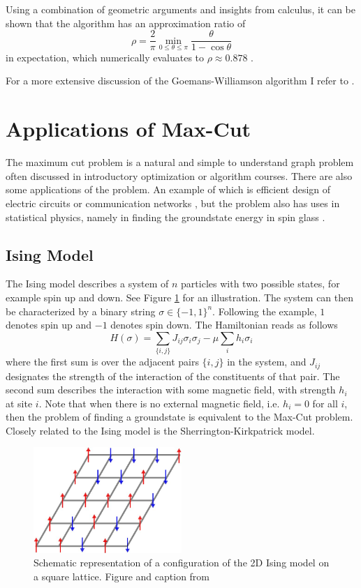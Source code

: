 Using a combination of geometric arguments and insights from calculus, it can be shown that the algorithm has an approximation ratio of 
\begin{equation}
\rho = \frac{2}{\pi} \min_{0 \leq \theta \leq \pi} \frac{\theta}{1 - \cos \theta}
\end{equation}
in expectation, which numerically evaluates to $\rho \approx 0.878$ \cite{GW95}. 

For a more extensive discussion of the Goemans-Williamson algorithm I refer to \cite{GW95,GW-lecture-Hollbach,lecture-GW}.

\section{Applications of Max-Cut}
The maximum cut problem is a natural and simple to understand graph problem often discussed in introductory optimization or algorithm courses. There are also some applications of the problem. An example of which is efficient design of electric circuits or communication networks \cite{wang2010maximum}, but the problem also has uses in statistical physics, namely in finding the groundstate energy in spin glass \cite{maxcut-applications}.

\subsection{Ising Model} %
The Ising model describes a system of $n$ particles with two possible states, for example spin up and down. See Figure \ref{fig:ising-model} for an illustration. The system can then be characterized by a binary string $\sigma \in \{-1,1\}^n$. Following the example, $1$ denotes spin up and $-1$ denotes spin down. The Hamiltonian reads as follows
\begin{equation}
H(\sigma) = \sum_{\{i,j\}} J_{ij} \sigma_i \sigma_j - \mu \sum_i h_i \sigma_i 
\end{equation}
where the first sum is over the adjacent pairs $\{i,j\}$ in the system, and $J_{ij}$ designates the strength of the interaction of the constituents of that pair. The second sum describes the interaction with some magnetic field, with strength $h_i$ at site $i$. Note that when there is no external magnetic field, i.e. $h_i = 0$ for all $i$, then the problem of finding a groundstate is equivalent to the Max-Cut problem. Closely related to the Ising model is the Sherrington-Kirkpatrick model. 

\begin{figure}[H]
	\centering
	\includegraphics[width=0.5\textwidth]{figures/Ising-model-on-a-square-lattice.jpg}
	\caption{Schematic representation of a configuration of the 2D Ising model on a square lattice. Figure and caption from \cite{ising-model}}
	\label{fig:ising-model}
\end{figure}